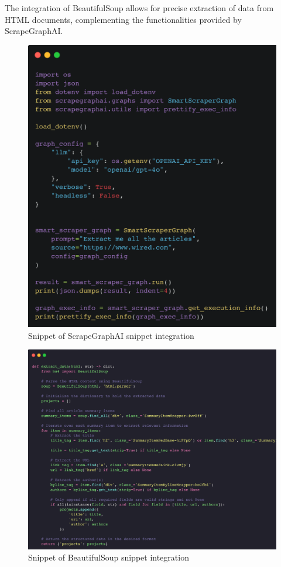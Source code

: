 The integration of BeautifulSoup allows for precise extraction of data from HTML documents, complementing the functionalities provided by ScrapeGraphAI.

\begin{figure}[H]
    \centering
    \includegraphics[width=0.95\linewidth]{Assets/smart_scraper_wired.png}
    \caption{Snippet of ScrapeGraphAI snippet integration}
    \label{fig:smart_scraper_wired}
\end{figure}

\begin{figure}[H]
    \centering
    \includegraphics[width=0.95\linewidth]{Assets/beautifousoup.png}
    \caption{Snippet of BeautifulSoup snippet integration}
    \label{fig:beautifousoup}
\end{figure}

